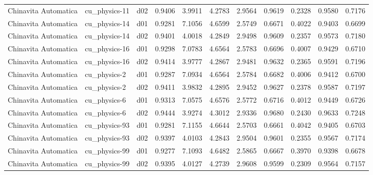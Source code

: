 \begin{longtable}{lllrrrrrrrr}
 Chinavita Automatica  &         cu\_physics-11 &     d02 &   0.9406 &   3.9911 &   4.2783 &       2.9564 &        0.9619 &       0.2328 &           0.9580 &  0.7176 \\
 Chinavita Automatica  &         cu\_physics-14 &     d01 &   0.9281 &   7.1056 &   4.6599 &       2.5749 &        0.6671 &       0.4022 &           0.9403 &  0.6699 \\
 Chinavita Automatica  &         cu\_physics-14 &     d02 &   0.9401 &   4.0018 &   4.2849 &       2.9498 &        0.9609 &       0.2357 &           0.9573 &  0.7180 \\
 Chinavita Automatica  &         cu\_physics-16 &     d01 &   0.9298 &   7.0783 &   4.6564 &       2.5783 &        0.6696 &       0.4007 &           0.9429 &  0.6710 \\
 Chinavita Automatica  &         cu\_physics-16 &     d02 &   0.9414 &   3.9777 &   4.2867 &       2.9481 &        0.9632 &       0.2365 &           0.9591 &  0.7196 \\
 Chinavita Automatica  &          cu\_physics-2 &     d01 &   0.9287 &   7.0934 &   4.6564 &       2.5784 &        0.6682 &       0.4006 &           0.9412 &  0.6700 \\
 Chinavita Automatica  &          cu\_physics-2 &     d02 &   0.9411 &   3.9832 &   4.2895 &       2.9452 &        0.9627 &       0.2378 &           0.9587 &  0.7197 \\
 Chinavita Automatica  &          cu\_physics-6 &     d01 &   0.9313 &   7.0575 &   4.6576 &       2.5772 &        0.6716 &       0.4012 &           0.9449 &  0.6726 \\
 Chinavita Automatica  &          cu\_physics-6 &     d02 &   0.9444 &   3.9274 &   4.3012 &       2.9336 &        0.9680 &       0.2430 &           0.9633 &  0.7248 \\
 Chinavita Automatica  &         cu\_physics-93 &     d01 &   0.9281 &   7.1155 &   4.6644 &       2.5703 &        0.6661 &       0.4042 &           0.9405 &  0.6703 \\
 Chinavita Automatica  &         cu\_physics-93 &     d02 &   0.9397 &   4.0103 &   4.2843 &       2.9504 &        0.9601 &       0.2355 &           0.9567 &  0.7174 \\
 Chinavita Automatica  &         cu\_physics-99 &     d01 &   0.9277 &   7.1093 &   4.6482 &       2.5865 &        0.6667 &       0.3970 &           0.9398 &  0.6678 \\
 Chinavita Automatica  &         cu\_physics-99 &     d02 &   0.9395 &   4.0127 &   4.2739 &       2.9608 &        0.9599 &       0.2309 &           0.9564 &  0.7157 \\

\end{longtable}

